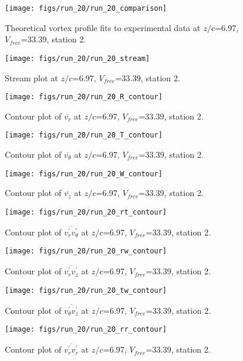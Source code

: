 \begin{figure}[H]
\centering
\texttt{[image: figs/run\_20/run\_20\_comparison]}
\caption{Theoretical vortex profile fits to experimental data at $z/c$=6.97, $V_{free}$=33.39, station 2.}
\end{figure}


\begin{figure}[H]
\centering
\texttt{[image: figs/run\_20/run\_20\_stream]}
\caption{Stream plot at $z/c$=6.97, $V_{free}$=33.39, station 2.}
\end{figure}


\begin{figure}[H]
\centering
\texttt{[image: figs/run\_20/run\_20\_R\_contour]}
\caption{Contour plot of $\overline{v_{r}}$ at $z/c$=6.97, $V_{free}$=33.39, station 2.}
\end{figure}


\begin{figure}[H]
\centering
\texttt{[image: figs/run\_20/run\_20\_T\_contour]}
\caption{Contour plot of $\overline{v_{\theta}}$ at $z/c$=6.97, $V_{free}$=33.39, station 2.}
\end{figure}


\begin{figure}[H]
\centering
\texttt{[image: figs/run\_20/run\_20\_W\_contour]}
\caption{Contour plot of $\overline{v_{z}}$ at $z/c$=6.97, $V_{free}$=33.39, station 2.}
\end{figure}


\begin{figure}[H]
\centering
\texttt{[image: figs/run\_20/run\_20\_rt\_contour]}
\caption{Contour plot of $\overline{v_{r}^{\prime} v_{\theta}^{\prime}}$ at $z/c$=6.97, $V_{free}$=33.39, station 2.}
\end{figure}


\begin{figure}[H]
\centering
\texttt{[image: figs/run\_20/run\_20\_rw\_contour]}
\caption{Contour plot of $\overline{v_{r}^{\prime} v_{z}^{\prime}}$ at $z/c$=6.97, $V_{free}$=33.39, station 2.}
\end{figure}


\begin{figure}[H]
\centering
\texttt{[image: figs/run\_20/run\_20\_tw\_contour]}
\caption{Contour plot of $\overline{v_{\theta}^{\prime} v_{z}^{\prime}}$ at $z/c$=6.97, $V_{free}$=33.39, station 2.}
\end{figure}


\begin{figure}[H]
\centering
\texttt{[image: figs/run\_20/run\_20\_rr\_contour]}
\caption{Contour plot of $\overline{v_{r}^{\prime} v_{r}^{\prime}}$ at $z/c$=6.97, $V_{free}$=33.39, station 2.}
\end{figure}


